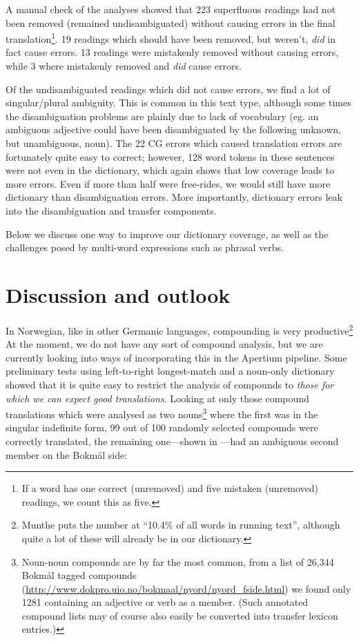 \documentclass[11pt]{article}
\begin{document}
A manual check of the analyses showed that 223 superfluous readings
had not been removed (remained undisambiguated) without causing errors
in the final translation\footnote{If a word has one correct
  (unremoved) and five mistaken (unremoved) readings, we count this as
  five.}. 19 readings which should have been removed, but weren't,
\emph{did} in fact cause errors.  13 readings were mistakenly removed
without causing errors, while 3 where mistakenly removed and
\emph{did} cause errors.

Of the undisambiguated readings which did not cause errors, we find a
lot of singular/plural ambiguity. This is common in this text type,
although some times the disambiguation problems are plainly due to
lack of vocabulary (eg. an ambiguous adjective could have been
disambiguated by the following unknown, but unambiguous, noun). The 22
CG errors which caused translation errors are fortunately quite easy
to correct; however, 128 word tokens in these sentences were not even
in the dictionary, which again shows that low coverage leads to more
errors. Even if more than half were free-rides, we would still have
more dictionary than disambiguation errors. More importantly,
dictionary errors leak into the disambiguation and transfer
components. 

Below we discuss one way to improve our dictionary coverage, as well
as the challenges posed by multi-word expressions such as phrasal
verbs.

\section{Discussion and outlook}
In Norwegian, like in other Germanic languages, compounding is very
productive\footnote{Munthe \citep[1972, in][p.~1]{johannessen1996aan}
  puts the number at ``10.4\% of all words in running text'', although
  quite a lot of these will already be in our dictionary.} At the
moment, we do not have any sort of compound analysis, but we are
currently looking into ways of incorporating this in the Apertium
pipeline. Some preliminary tests using left-to-right longest-match and
a noun-only dictionary showed that it is quite easy to restrict the
analysis of compounds to \emph{those for which we can expect good
  translations}. Looking at only those compound translations which
were analysed as two nouns\footnote{Noun-noun compounds are
  by far the most common, from a list of 26,344 Bokmål tagged compounds
  (\href{http://www.dokpro.uio.no/bokmaal/nyord/nyord_fside.html}{http://www.dokpro.uio.no/bokmaal/nyord/nyord\_fside.html})
  we
  found only 1281 containing an adjective or verb as a member. (Such
  annotated compound lists may of course also easily be converted into
  transfer lexicon entries.)} where the first was in the singular
indefinite form, 99 out of 100 randomly selected compounds were
correctly translated, the remaining one—shown in \Next[b]—had an
ambiguous second member on the Bokmål side:
\end{document}
